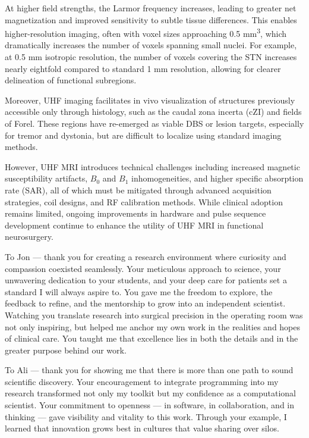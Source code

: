 At higher field strengths, the Larmor frequency increases, leading to greater net magnetization and improved sensitivity to subtle tissue differences. This enables higher-resolution imaging, often with voxel sizes approaching 0.5 mm\textsuperscript{3}, which dramatically increases the number of voxels spanning small nuclei. For example, at 0.5 mm isotropic resolution, the number of voxels covering the STN increases nearly eightfold compared to standard 1 mm resolution, allowing for clearer delineation of functional subregions.

Moreover, UHF imaging facilitates in vivo visualization of structures previously accessible only through histology, such as the caudal zona incerta (cZI) and fields of Forel. These regions have re-emerged as viable DBS or lesion targets, especially for tremor and dystonia, but are difficult to localize using standard imaging methods.

However, UHF MRI introduces technical challenges including increased magnetic susceptibility artifacts, \( B_0 \) and \( B_1 \) inhomogeneities, and higher specific absorption rate (SAR), all of which must be mitigated through advanced acquisition strategies, coil designs, and RF calibration methods. While clinical adoption remains limited, ongoing improvements in hardware and pulse sequence development continue to enhance the utility of UHF MRI in functional neurosurgery.


To Jon — thank you for creating a research environment where curiosity and compassion coexisted seamlessly. Your meticulous approach to science, your unwavering dedication to your students, and your deep care for patients set a standard I will always aspire to. You gave me the freedom to explore, the feedback to refine, and the mentorship to grow into an independent scientist. Watching you translate research into surgical precision in the operating room was not only inspiring, but helped me anchor my own work in the realities and hopes of clinical care. You taught me that excellence lies in both the details and in the greater purpose behind our work.

To Ali — thank you for showing me that there is more than one path to sound scientific discovery. Your encouragement to integrate programming into my research transformed not only my toolkit but my confidence as a computational scientist. Your commitment to openness — in software, in collaboration, and in thinking — gave visibility and vitality to this work. Through your example, I learned that innovation grows best in cultures that value sharing over silos.

